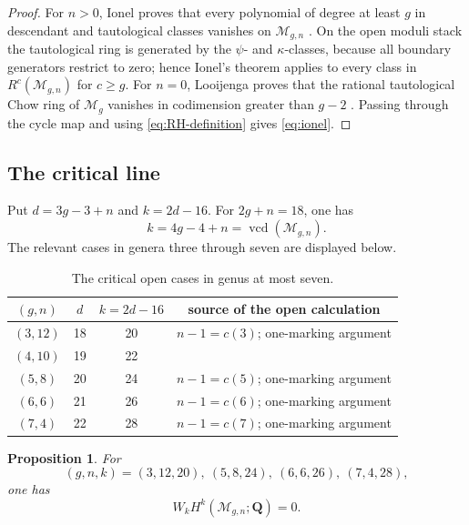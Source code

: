 \documentclass[12pt,reqno]{amsart}
\newcommand{\Q}{\mathbf{Q}}
\newcommand{\M}{\mathcal{M}}
\newcommand{\vcd}{\operatorname{vcd}}
\newtheorem{proposition}[theorem]{Proposition}
\theoremstyle{definition}
\theoremstyle{remark}
\begin{document}
\begin{proof}
For $n>0$, Ionel proves that every polynomial of degree at least $g$ in
descendant and tautological classes vanishes on $\M_{g,n}$
\cite[Theorem~0.1]{Ionel}.  On the open moduli stack the tautological ring
is generated by the $\psi$- and $\kappa$-classes, because all boundary
generators restrict to zero; hence Ionel's theorem applies to every class
in $R^c(\M_{g,n})$ for $c\geq g$.  For $n=0$, Looijenga proves that the
rational tautological Chow ring of $\M_g$ vanishes in codimension greater than
$g-2$ \cite[Theorem~1.1]{Looijenga}.  Passing through the cycle map and
using \eqref{eq:RH-definition} gives \eqref{eq:ionel}.
\end{proof}

\subsection{The critical line}

Put $d=3g-3+n$ and $k=2d-16$.  For $2g+n=18$, one has
\begin{equation}\label{eq:critical-arithmetic}
 k=4g-4+n=\vcd(\M_{g,n}).
\end{equation}
The relevant cases in genera three through seven are displayed below.

\begin{table}[ht]
\centering
\caption{The critical open cases in genus at most seven.}
\label{tab:critical}
\small
\begin{tabular}{@{}cccc@{}}
\toprule
$(g,n)$&$d$&$k=2d-16$&source of the open calculation\\
\midrule
$(3,12)$&18&20&$n-1=c(3)$; one-marking argument\\
$(4,10)$&19&22&\cite[Proposition~4.5]{CLP}\\
$(5,8)$ &20&24&$n-1=c(5)$; one-marking argument\\
$(6,6)$ &21&26&$n-1=c(6)$; one-marking argument\\
$(7,4)$ &22&28&$n-1=c(7)$; one-marking argument\\
\bottomrule
\end{tabular}
\end{table}

\begin{proposition}\label{prop:endpoint-vanishing}
For
\[
 (g,n,k)=(3,12,20),\ (5,8,24),\ (6,6,26),\ (7,4,28),
\]
one has
\begin{equation}\label{eq:endpoint-zero}
 W_kH^k(\M_{g,n};\Q)=0.
\end{equation}
\end{proposition}
\end{document}
